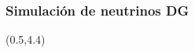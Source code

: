 \begin{frame}
 \frametitle{Simulaci\'on de neutrinos DG}
 \begin{textblock}{14.5}(0.5,4.4)
 \end{textblock}
 
\end{frame}

